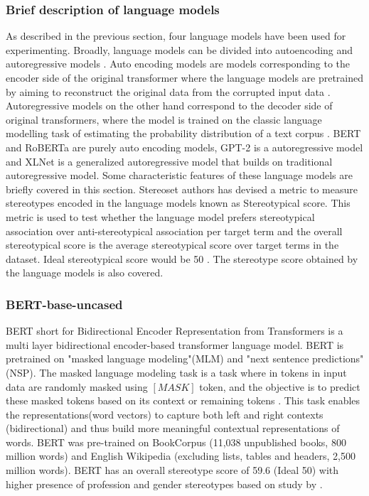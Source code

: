 \subsubsection{Brief description of language models}
As described in the previous section, four language models have been used for experimenting. Broadly, language models can be divided into autoencoding and autoregressive models \cite{yang2019xlnet}. Auto encoding models are models corresponding to the encoder side of the original transformer \cite{vaswani2017attention} where the language models are pretrained by aiming to reconstruct the original data from the corrupted input data \cite{yang2019xlnet}. Autoregressive models on the other hand correspond to the decoder side of original transformers, where the model is trained on the classic language modelling task of estimating the probability distribution of a text corpus \cite{yang2019xlnet}. BERT and RoBERTa are purely auto encoding models, GPT-2 is a autoregressive model and XLNet is a generalized autoregressive model that builds on traditional autoregressive model. Some characteristic features of these language models are briefly covered in this section. Stereoset authors has devised a metric to measure stereotypes encoded in the language models known as  Stereotypical score. This metric is used to test whether the language model prefers stereotypical association over anti-stereotypical association per target term \cite{nadeem2020stereoset} and the overall stereotypical score is the average stereotypical score over target terms in the dataset. Ideal stereotypical score would be 50 \cite{nadeem2020stereoset}. The stereotype score obtained by the language models is also covered.   

\subsubsection{BERT-base-uncased}

BERT short for Bidirectional Encoder Representation from Transformers is a multi layer bidirectional encoder-based transformer language model\cite{devlin2018bert}. BERT is pretrained  on "masked language modeling"(MLM) and "next sentence predictions"(NSP). The masked language modeling task is a task where in tokens in input data are randomly masked using $[MASK]$ token, and the objective is to predict these masked tokens based on its context or remaining tokens \cite{devlin2018bert}. This task enables the representations(word vectors) to capture both left and right contexts (bidirectional) and thus build more meaningful contextual representations of words. BERT was pre-trained on BookCorpus (11,038 unpublished books, 800 million words) and English Wikipedia (excluding lists, tables and headers, 2,500 million words). BERT has an overall stereotype score of 59.6 (Ideal 50) with higher presence of profession and gender stereotypes based on study by \cite{nadeem2020stereoset}. 

